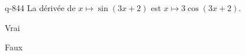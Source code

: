 \begin{truefalse}{q-844}
La dérivée de $x\mapsto \sin(3x+2)$ est $x\mapsto 3\cos(3x+2)$.
\item* Vrai
\item Faux
\end{truefalse}

